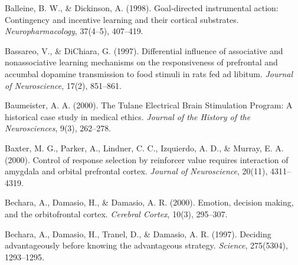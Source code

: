 \documentclass[conference]{IEEEtran}
\begin{document}
\begin{enumerate}
Balleine, B. W., \& Dickinson, A. (1998). Goal-directed instrumental action: Contingency and incentive learning and their cortical substrates. \textit{Neuropharmacology}, 37(4--5), 407--419.

Bassareo, V., \& DiChiara, G. (1997). Differential influence of associative and nonassociative learning mechanisms on the responsiveness of prefrontal and accumbal dopamine transmission to food stimuli in rats fed ad libitum. \textit{Journal of Neuroscience}, 17(2), 851--861.

Baumeister, A. A. (2000). The Tulane Electrical Brain Stimulation Program: A historical case study in medical ethics. \textit{Journal of the History of the Neurosciences}, 9(3), 262--278.

Baxter, M. G., Parker, A., Lindner, C. C., Izquierdo, A. D., \& Murray, E. A. (2000). Control of response selection by reinforcer value requires interaction of amygdala and orbital prefrontal cortex. \textit{Journal of Neuroscience}, 20(11), 4311--4319.

Bechara, A., Damasio, H., \& Damasio, A. R. (2000). Emotion, decision making, and the orbitofrontal cortex. \textit{Cerebral Cortex}, 10(3), 295--307.

Bechara, A., Damasio, H., Tranel, D., \& Damasio, A. R. (1997). Deciding advantageously before knowing the advantageous strategy. \textit{Science}, 275(5304), 1293--1295.

\end{enumerate}
\end{document}
